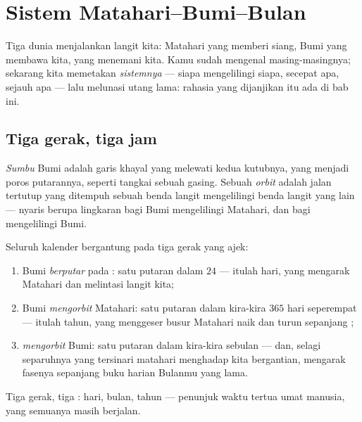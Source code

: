 \chapter{Sistem Matahari--Bumi--Bulan}\label{ch:g6:sun-earth-moon}

Tiga dunia menjalankan langit kita: Matahari yang memberi siang, Bumi
yang membawa kita,  yang menemani kita. Kamu sudah mengenal
masing-masingnya; sekarang kita memetakan \emph{sistemnya} --- siapa
mengelilingi siapa, secepat apa, sejauh apa --- lalu melunasi utang
lama: rahasia  yang dijanjikan itu ada di bab ini.

\section{Tiga gerak, tiga jam}

\begin{definition}\label{def:g6:sun-earth-moon:axisorbit}
\emph{Sumbu} Bumi adalah garis khayal yang melewati kedua
kutubnya, yang menjadi poros putarannya, seperti tangkai sebuah
gasing. Sebuah \emph{orbit} adalah jalan tertutup yang
ditempuh sebuah benda langit mengelilingi benda langit yang lain ---
nyaris berupa lingkaran bagi Bumi mengelilingi Matahari, dan bagi
 mengelilingi Bumi.
\end{definition}

\begin{proposition}\label{prop:g6:sun-earth-moon:motions}
Seluruh kalender bergantung pada tiga gerak yang ajek:
\begin{enumerate}
  \item Bumi \emph{berputar} pada : satu putaran dalam $24$
         --- itulah hari, yang mengarak Matahari dan 
        melintasi langit kita;
  \item Bumi \emph{mengorbit} Matahari: satu putaran dalam kira-kira
        $365$ hari seperempat --- itulah tahun, yang menggeser busur
        Matahari naik dan turun sepanjang ;
  \item {} \emph{mengorbit} Bumi: satu putaran dalam kira-kira
        sebulan --- dan, selagi separuhnya yang tersinari matahari
        menghadap kita bergantian, mengarak fasenya sepanjang buku
        harian Bulanmu yang lama.
\end{enumerate}
Tiga gerak, tiga : hari, bulan, tahun --- penunjuk waktu tertua
umat manusia, yang semuanya masih berjalan.
\end{proposition}

